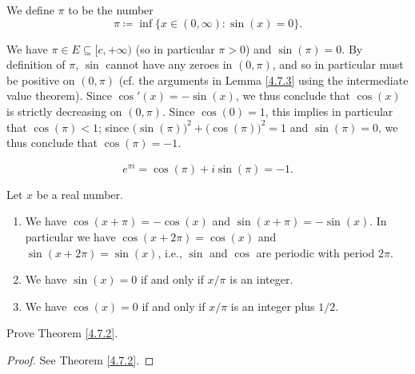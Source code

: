 \begin{definition}\label{4.7.4}
    We define \(\pi\) to be the number
    \[
        \pi \coloneqq \inf\{x \in (0, \infty) : \sin(x) = 0\}.
    \]
\end{definition}

\begin{additional corollary}\label{ac 4.7.2}
We have \(\pi \in E \subseteq [c, +\infty)\) (so in particular \(\pi > 0\)) and \(\sin(\pi) = 0\).
By definition of \(\pi\), \(\sin\) cannot have any zeroes in \((0, \pi)\), and so in particular must be positive on \((0, \pi)\)
(cf. the arguments in Lemma \ref{4.7.3} using the intermediate value theorem).
Since \(\cos'(x) = -\sin(x)\), we thus conclude that \(\cos(x)\) is strictly decreasing on \((0, \pi)\).
Since \(\cos(0) = 1\), this implies in particular that \(\cos(\pi) < 1\);
since \(\big(\sin(\pi)\big)^2 + \big(\cos(\pi)\big)^2 = 1\) and \(\sin(\pi) = 0\), we thus conclude that \(\cos(\pi) = -1\).
\end{additional corollary}

\begin{additional corollary}\label{ac 4.7.3}
\[
    e^{\pi i} = \cos(\pi) + i \sin(\pi) = -1.
\]
\end{additional corollary}

\begin{theorem}\label{4.7.5}
    Let \(x\) be a real number.
    \begin{enumerate}
        \item We have \(\cos(x + \pi) = -\cos(x)\) and \(\sin(x + \pi) = -\sin(x)\).
              In particular we have \(\cos(x + 2\pi) = \cos(x)\) and \(\sin(x + 2\pi) = \sin(x)\), i.e., \(\sin\) and \(\cos\) are periodic with period \(2\pi\).
        \item We have \(\sin(x) = 0\) if and only if \(x / \pi\) is an integer.
        \item We have \(\cos(x) = 0\) if and only if \(x / \pi\) is an integer plus \(1 / 2\).
    \end{enumerate}
\end{theorem}

\exercisesection

\begin{exercise}\label{ex 4.7.1}
    Prove Theorem \ref{4.7.2}.
\end{exercise}

\begin{proof}
    See Theorem \ref{4.7.2}.
\end{proof}

